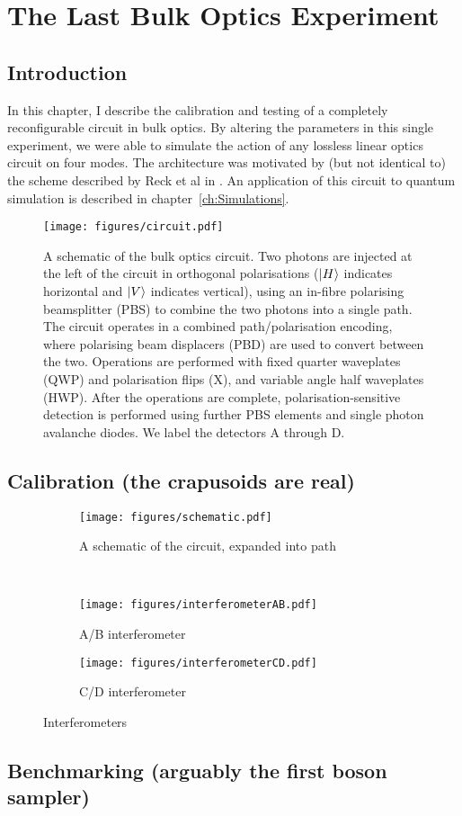 \chapter{The Last Bulk Optics Experiment}
\label{ch:BulkCircuit}
\section{Introduction}
In this chapter, I describe the calibration and testing of a completely
reconfigurable circuit in bulk optics. By altering the parameters in this single
experiment, we were able to simulate the action of any lossless linear optics
circuit on four modes. The architecture was motivated by (but not identical to)
the scheme described by Reck et al in \cite{reck94}. An application of this
circuit to quantum simulation is described in chapter~\ref{ch:Simulations}.

\begin{figure}
  \centering
  \texttt{[image: figures/circuit.pdf]}
  \caption{A schematic of the bulk optics circuit. Two photons are injected at
the left of the circuit in orthogonal polarisations (\(\left|H\right\rangle\) indicates
horizontal and \(\left|V\right\rangle\) indicates vertical), using an in-fibre polarising
beamsplitter
(PBS) to combine the two photons into a single path. The circuit operates in a
combined path/polarisation encoding, where polarising beam displacers (PBD) are
used to convert between the two. Operations are performed with fixed quarter
waveplates (QWP) and polarisation flips (X), and variable angle half waveplates
(HWP). After the operations are complete, polarisation-sensitive detection is
performed using further PBS elements and single photon avalanche diodes. We
label the detectors A through D.}
  \label{fig:circuit}
\end{figure}

\section{Calibration (the crapusoids are real)}

\begin{figure}
  \centering
  \begin{subfigure}{\textwidth}
    \texttt{[image: figures/schematic.pdf]}
    \caption{A schematic of the circuit, expanded into path}
    \label{fig:schematic}
  \end{subfigure} \\
  \vspace{1cm}
  \begin{subfigure}{0.45\textwidth}
    \texttt{[image: figures/interferometerAB.pdf]}
    \caption{A/B interferometer}
    \label{fig:ab}
  \end{subfigure}
  \hspace{0.05\textwidth}
  \begin{subfigure}{0.45\textwidth}
    \texttt{[image: figures/interferometerCD.pdf]}
    \caption{C/D interferometer}
    \label{fig:cd}
  \end{subfigure}
  \caption{Interferometers}
  \label{fig:interferometers}
\end{figure}

\section{Benchmarking (arguably the first boson sampler)}

